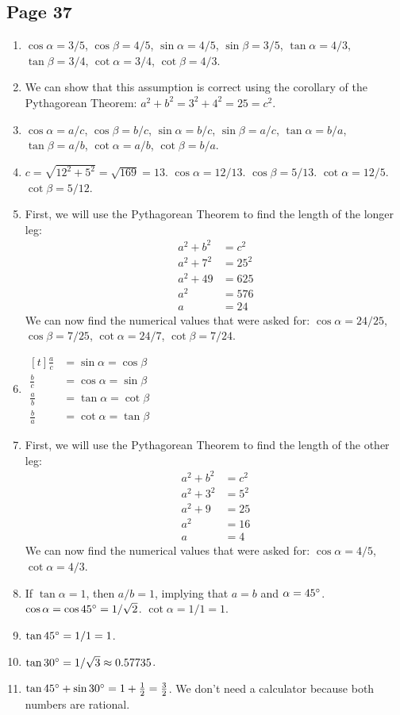 \documentclass{article}
\newenvironment{solutions}[1]
{\subsection*{#1}
 \begin{enumerate}[leftmargin=1.5em]}
{\end{enumerate}}
\newcommand{\solution}{\item}
\begin{document}
\begin{solutions}{Page 37}
\solution %
$\cos{\alpha}=3/5$, $\cos{\beta}=4/5$, $\sin{\alpha}=4/5$, $\sin{\beta}=3/5$, $\tan{\alpha}=4/3$, $\tan{\beta}=3/4$, $\cot{\alpha}=3/4$, $\cot{\beta}=4/3$.

\solution %
We can show that this assumption is correct using the corollary of the Pythagorean Theorem:
$a^2 + b^{2} = 3^{2} + 4^{2} = 25 = c^2$.

\solution %
$\cos{\alpha}=a/c$, $\cos{\beta}=b/c$, $\sin{\alpha}=b/c$, $\sin{\beta}=a/c$, $\tan{\alpha}=b/a$, $\tan{\beta}=a/b$, $\cot{\alpha}=a/b$, $\cot{\beta}=b/a$.

\solution %
$c = \sqrt{12^2 + 5^2} = \sqrt{169} = 13$. $\cos{\alpha}=12/13$. $\cos{\beta}=5/13$. $\cot{\alpha}=12/5$. $\cot{\beta}=5/12$.

\solution %
First, we will use the Pythagorean Theorem to find the length of the longer leg:
\begin{align*}
a^2 + b^2 &= c^2\\
a^2 + 7^2 &= 25^2\\
a^2 + 49 &= 625\\
a^2 &= 576\\
a &= 24
\end{align*}
We can now find the numerical values that were asked for: $\cos{\alpha}=24/25$, $\cos{\beta}=7/25$, $\cot{\alpha}=24/7$, $\cot{\beta}=7/24$.

\solution %
$\begin{aligned}[t]
\frac{a}{c} &= \sin{\alpha} = \cos{\beta}\\
\frac{b}{c} &= \cos{\alpha} = \sin{\beta}\\
\frac{a}{b} &= \tan{\alpha} = \cot{\beta}\\
\frac{b}{a} &= \cot{\alpha} = \tan{\beta}
\end{aligned}$

\solution %
First, we will use the Pythagorean Theorem to find the length of the other leg:
\begin{align*}
a^2 + b^2 &= c^2\\
a^2 + 3^2 &= 5^2\\
a^2 + 9 &= 25\\
a^2 &= 16\\
a &= 4
\end{align*}
We can now find the numerical values that were asked for: $\cos{\alpha}=4/5$, $\cot{\alpha}=4/3$.

\solution %
If $\tan{\alpha} = 1$, then $a/b=1$, implying that $a = b$ and $\alpha = 45\degree$. $\cos{\alpha} = \cos{45\degree} = 1/\sqrt{2}$. $\cot{\alpha} = 1/1 = 1$. 

\solution %
$\tan{45\degree} = 1/1 = 1$.

\solution %
$\tan{30\degree} = 1/\sqrt{3} \approx 0.57735$.

\solution %
$\tan{45\degree} + \sin{30\degree} = 1 + \frac{1}{2} = \frac{3}{2}$. We don't need a calculator because both numbers are rational.

\end{solutions}
\end{document}
